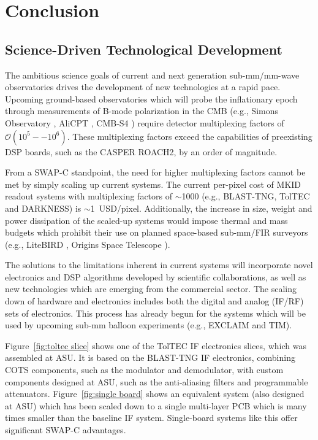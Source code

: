 \chapter{Conclusion}\label{conclusion}

\section{Science-Driven Technological Development}

The ambitious science goals of current and next generation sub-mm/mm-wave observatories drives the development of new technologies at a rapid pace. Upcoming ground-based observatories which will probe the inflationary epoch through measurements of B-mode polarization in the CMB (e.g., Simons Observatory \citep{ade2019simons}, AliCPT \citep{li2018probing}, CMB-S4 \citep{abitbol2017cmb}) require detector multiplexing factors of $\mathcal{O}(10^{5}--10^{6})$. These multiplexing factors exceed the capabilities of preexisting DSP boards, such as the CASPER ROACH2, by an order of magnitude.

From a SWAP-C standpoint, the need for higher multiplexing factors cannot be met by simply scaling up current systems. The current per-pixel cost of MKID readout systems with multiplexing factors of $\sim$1000 (e.g., BLAST-TNG, TolTEC and DARKNESS) is $\sim$1~USD/pixel. Additionally, the increase in size, weight and power dissipation of the scaled-up systems would impose thermal and mass budgets which prohibit their use on planned space-based sub-mm/FIR surveyors (e.g., LiteBIRD \citep{matsumura2014mission}, Origins Space Telescope \citep{battersby2018origins}).

The solutions to the limitations inherent in current systems will incorporate novel electronics and DSP algorithms developed by scientific collaborations, as well as new technologies which are emerging from the commercial sector. The scaling down of hardware and electronics includes both the digital and analog (IF/RF) sets of electronics. This process has already begun for the systems which will be used by upcoming sub-mm balloon experiments (e.g., EXCLAIM and TIM).

Figure~\ref{fig:toltec slice} shows one of the TolTEC IF electronics slices, which was assembled at ASU. It is based on the BLAST-TNG IF electronics, combining COTS components, such as the modulator and demodulator, with custom components designed at ASU, such as the anti-aliasing filters and programmable attenuators. Figure~\ref{fig:single board} shows an equivalent system (also designed at ASU) which has been scaled down to a single multi-layer PCB which is many times smaller than the baseline IF system. Single-board systems like this offer significant SWAP-C advantages.


